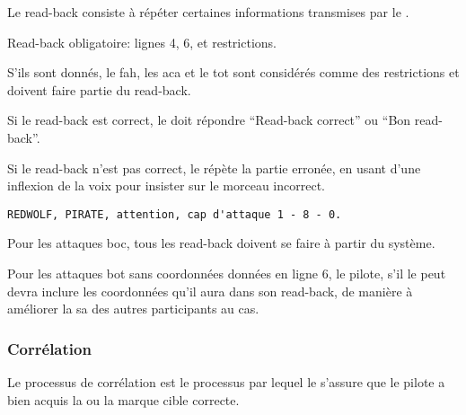 \begin{e1}
	
	\item Le read-back consiste à répéter certaines informations transmises par le \ja{}.
	
	\item Read-back obligatoire: lignes 4, 6, et restrictions.
	
	\item S'ils sont donnés, le \gls{fah}, les \gls{aca} et le \gls{tot} sont considérés comme des restrictions et doivent faire partie du read-back.
	
	\item Si le read-back est correct, le \ja{} doit répondre ``Read-back correct'' ou ``Bon read-back''.
	
	\begin{minipage}{\linewidth}
		
		\item Si le read-back n'est pas correct, le \ja{} répète la partie erronée, en usant d'une inflexion de la voix pour insister sur le morceau incorrect.
		\begin{lstlisting}[caption=Read-back incorrect, label=9lrbwrong]
REDWOLF, PIRATE, attention, cap d'attaque 1 - 8 - 0.
		\end{lstlisting}
	\end{minipage}
	
	\item Pour les attaques \gls{boc}, tous les read-back doivent se faire à partir du système.
	
	\item Pour les attaques \gls{bot} sans coordonnées données en ligne 6, le pilote, s'il le peut devra inclure les coordonnées qu'il aura dans son read-back, de manière à améliorer la \gls{sa} des autres participants au \gls{cas}.
	
\end{e1}
	
\subsubsection{Corrélation}%

Le processus de corrélation est le processus par lequel le \ja{} s'assure que le pilote a bien acquis la ou la marque cible correcte.
	
